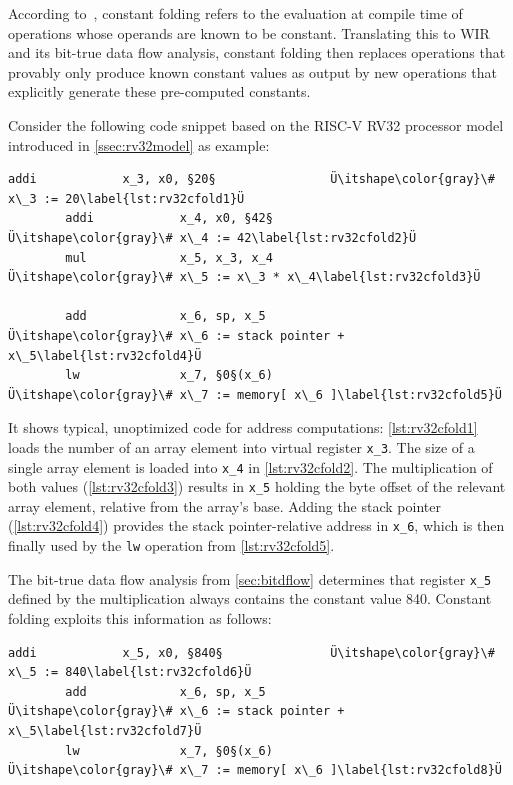According to~\cite[chapter~12.1]{Much97}, constant folding refers to the evaluation at compile time of operations whose operands are known to be constant.
Translating this to \gls{WIR} and its bit-true data flow analysis, constant folding then replaces operations that provably only produce known constant values as output by new operations that explicitly generate these pre-computed constants.

\begin{wirExample}\label{ex:cfold}
Consider the following code snippet based on the RISC-V RV32 processor model introduced in \cref{ssec:rv32model} as example:
\begin{lstlisting}[style=code]
        addi            x_3, x0, §20§                Ü\itshape\color{gray}\# x\_3 := 20\label{lst:rv32cfold1}Ü
        addi            x_4, x0, §42§                Ü\itshape\color{gray}\# x\_4 := 42\label{lst:rv32cfold2}Ü
        mul             x_5, x_3, x_4              Ü\itshape\color{gray}\# x\_5 := x\_3 * x\_4\label{lst:rv32cfold3}Ü

        add             x_6, sp, x_5               Ü\itshape\color{gray}\# x\_6 := stack pointer + x\_5\label{lst:rv32cfold4}Ü
        lw              x_7, §0§(x_6)                Ü\itshape\color{gray}\# x\_7 := memory[ x\_6 ]\label{lst:rv32cfold5}Ü
\end{lstlisting}
It shows typical, unoptimized code for address computations:
\cref{lst:rv32cfold1} loads the number of an array element into virtual register \texttt{x\_3}.
The size of a single array element is loaded into \texttt{x\_4} in \cref{lst:rv32cfold2}.
The multiplication of both values (\cref{lst:rv32cfold3}) results in \texttt{x\_5} holding the byte offset of the relevant array element, relative from the array's base.
Adding the stack pointer (\cref{lst:rv32cfold4}) provides the stack pointer-relative address in \texttt{x\_6}, which is then finally used by the \texttt{lw} operation from \cref{lst:rv32cfold5}.

The bit-true data flow analysis from \cref{sec:bitdflow} determines that register \texttt{x\_5} defined by the multiplication always contains the constant value 840.
Constant folding exploits this information as follows:
\begin{lstlisting}[style=code,firstnumber=4]
        addi            x_5, x0, §840§               Ü\itshape\color{gray}\# x\_5 := 840\label{lst:rv32cfold6}Ü
        add             x_6, sp, x_5               Ü\itshape\color{gray}\# x\_6 := stack pointer + x\_5\label{lst:rv32cfold7}Ü
        lw              x_7, §0§(x_6)                Ü\itshape\color{gray}\# x\_7 := memory[ x\_6 ]\label{lst:rv32cfold8}Ü
\end{lstlisting}
\end{wirExample}

